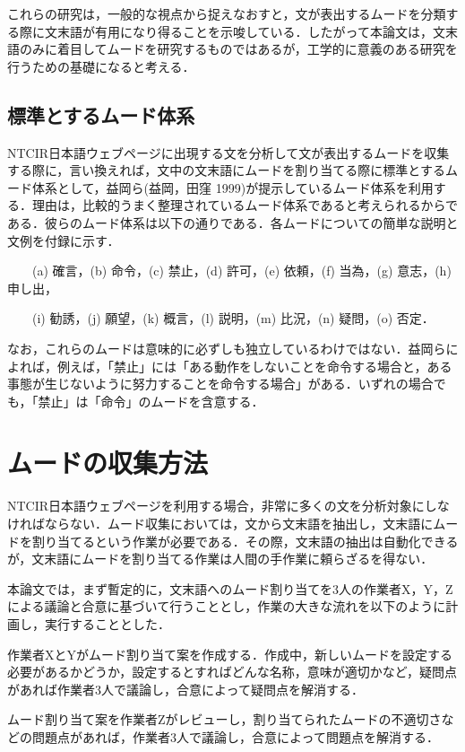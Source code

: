 \documentclass[japanese]{jnlp_1.4}
\newcommand{\InHone}[1]{}
\begin{document}
これらの研究は，一般的な視点から捉えなおすと，文が表出するムードを分類する際に文末語が有用になり得ることを示唆している．したがって本論文は，文末語のみに着目してムードを研究するものではあるが，工学的に意義のある研究を行うための基礎になると考える．

\subsection{標準とするムード体系}

NTCIR日本語ウェブページに出現する文を分析して文が表出するムードを収集する際に，言い換えれば，文中の文末語にムードを割り当てる際に標準とするムード体系として，益岡ら(益岡，田窪 1999)が提示しているムード体系を利用する．理由は，比較的うまく整理されているムード体系であると考えられるからである．彼らのムード体系は以下の通りである．各ムードについての簡単な説明と文例を付録に示す．

　　(a) 確言，(b) 命令，(c) 禁止，(d) 許可，(e) 依頼，(f) 当為，(g) 意志，(h) 申し出，\par
　　(i) 勧誘，(j) 願望，(k) 概言，(l) 説明，(m) 比況，(n) 疑問，(o) 否定．

なお，これらのムードは意味的に必ずしも独立しているわけではない．益岡らによれば，例えば，「禁止」には「ある動作をしないことを命令する場合と，ある事態が生じないように努力することを命令する場合」がある．いずれの場合でも，「禁止」は「命令」のムードを含意する．


\section{ムードの収集方法}

NTCIR日本語ウェブページを利用する場合，非常に多くの文を分析対象にしなければならない．ムード収集においては，文から文末語を抽出し，文末語にムードを割り当てるという作業が必要である．その際，文末語の抽出は自動化できるが，文末語にムードを割り当てる作業は人間の手作業に頼らざるを得ない．

本論文では，まず暫定的に，文末語へのムード割り当てを3人の作業者X，Y，Zによる議論と合意に基づいて行うこととし，作業の大きな流れを以下のように計画し，実行することとした．

\InHone{(1)} 
作業者XとYがムード割り当て案を作成する．作成中，新しいムードを設定する必要があるかどうか，設定するとすればどんな名称，意味が適切かなど，疑問点があれば作業者3人で議論し，合意によって疑問点を解消する．

\InHone{(2)} 
ムード割り当て案を作業者Zがレビューし，割り当てられたムードの不適切さなどの問題点があれば，作業者3人で議論し，合意によって問題点を解消する．
\end{document}
